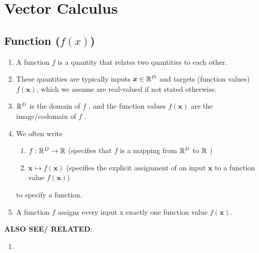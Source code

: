 \chapter{Vector Calculus}

\section{Function ($f(x)$)}

\begin{enumerate}
    \item A function $f$ is a quantity that relates two quantities to each other. 
    \hfill \cite{mfml/book/mml/Deisenroth-Faisal-Ong}

    \item These quantities are typically inputs $\bm{x} \in \mathbb{R}^D$ and targets (function values) $f (\bm{x})$, which we assume are real-valued if not stated otherwise. 
    \hfill \cite{mfml/book/mml/Deisenroth-Faisal-Ong}
    
    \item $\mathbb{R}^D$ is the domain of $f$ , and the function values $f (\bm{x})$ are the image/codomain of $f$ .
    \hfill \cite{mfml/book/mml/Deisenroth-Faisal-Ong}

    \item We often write 
    \hfill \cite{mfml/book/mml/Deisenroth-Faisal-Ong}
    \begin{enumerate}
        \item $f: \mathbb{R}^D \to \mathbb{R}$ 
        (specifies that $f$ is a mapping from $\mathbb{R}^D$ to $\mathbb{R}$ )
        \hfill \cite{mfml/book/mml/Deisenroth-Faisal-Ong}
        
        \item $\bm{x} \mapsto f(\bm{x})$ 
        (specifies the explicit assignment of an input $\bm{x}$ to a function value $f(\bm{x})$)
        \hfill \cite{mfml/book/mml/Deisenroth-Faisal-Ong}
    \end{enumerate}
    to specify a function.
    \hfill \cite{mfml/book/mml/Deisenroth-Faisal-Ong}

    \item A function $f$ assigns every input x exactly one function value $f (\bm{x})$.
    \hfill \cite{mfml/book/mml/Deisenroth-Faisal-Ong}
\end{enumerate}

\vspace{0.5cm}
\textbf{ALSO SEE/ RELATED}:
\begin{enumerate}
    \item {}
\end{enumerate}



